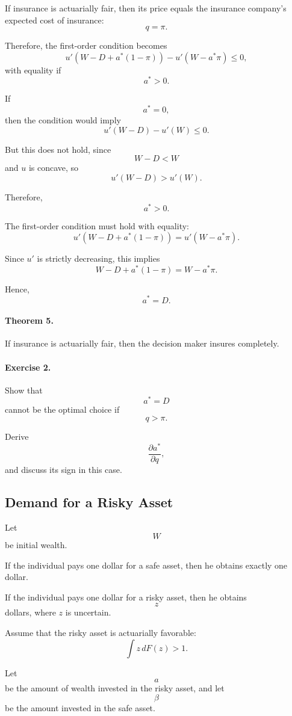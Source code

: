 If insurance is actuarially fair, then its price equals the insurance company's expected cost of insurance:
\[
q=\pi.
\]

Therefore, the first-order condition becomes
\[
u'(W-D+a^*(1-\pi))
-
u'(W-a^*\pi)
\le 0,
\]
with equality if
\[
a^*>0.
\]

If
\[
a^*=0,
\]
then the condition would imply
\[
u'(W-D)-u'(W)\le 0.
\]

But this does not hold, since
\[
W-D<W
\]
and \(u\) is concave, so
\[
u'(W-D)>u'(W).
\]

Therefore,
\[
a^*>0.
\]

The first-order condition must hold with equality:
\[
u'(W-D+a^*(1-\pi))
=
u'(W-a^*\pi).
\]

Since \(u'\) is strictly decreasing, this implies
\[
W-D+a^*(1-\pi)
=
W-a^*\pi.
\]

Hence,
\[
a^*=D.
\]

\paragraph{Theorem 5.}

If insurance is actuarially fair, then the decision maker insures completely.

\paragraph{Exercise 2.}

Show that
\[
a^*=D
\]
cannot be the optimal choice if
\[
q>\pi.
\]

Derive
\[
\frac{\partial a^*}{\partial q},
\]
and discuss its sign in this case.



\subsection{Demand for a Risky Asset}

Let
\[
W
\]
be initial wealth.

If the individual pays one dollar for a safe asset, then he obtains exactly one dollar.

If the individual pays one dollar for a risky asset, then he obtains
\[
z
\]
dollars, where \(z\) is uncertain.

Assume that the risky asset is actuarially favorable:
\[
\int z\,dF(z)>1.
\]

Let
\[
a
\]
be the amount of wealth invested in the risky asset, and let
\[
\beta
\]
be the amount invested in the safe asset.


